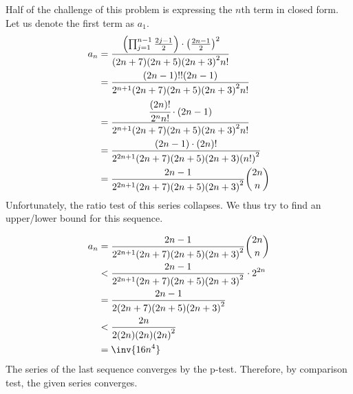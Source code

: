 \item

Half of the challenge of this problem is expressing the $n$th term in closed form.
Let us denote the first term as $a_1$.
\begin{align*}
	a_n
	 & = \cfrac{
		\left( \prod_{j = 1}^{n - 1} \frac{2j - 1}{2} \right) \cdot {\left( \frac{2n - 1}{2} \right)}^2
	}{
		(2n + 7) (2n + 5) {(2n + 3)}^2 n!
	}                                                                                              \\
	 & = \frac{(2n - 1)!! (2n - 1)}{2^{n + 1} (2n + 7) (2n + 5) {(2n + 3)}^2 n!}                   \\
	 & = \cfrac{\cfrac{(2n)!}{2^n n!} \cdot (2n - 1)}{2^{n + 1} (2n + 7) (2n + 5) {(2n + 3)}^2 n!} \\
	 & = \frac{(2n - 1) \cdot (2n)!}{2^{2n + 1} (2n + 7) (2n + 5) (2n + 3) {(n!)}^2} \\
  & = \frac{2n - 1}{2^{2n + 1} (2n + 7) (2n + 5) {(2n + 3)}^2} \binom{2n}{n}
\end{align*}
Unfortunately, the ratio test of this series collapses.
We thus try to find an upper/lower bound for this sequence.

\begin{align*}
    a_n
    &= \frac{2n - 1}{2^{2n + 1} (2n + 7) (2n + 5) {(2n + 3)}^2} \binom{2n}{n} \\
    &< \frac{2n - 1}{2^{2n + 1} (2n + 7) (2n + 5) {(2n + 3)}^2} \cdot 2^{2n} \\
    &=\frac{2n - 1}{2 (2n + 7) (2n + 5) {(2n + 3)}^2} \\
    &< \frac{2n}{2 (2n) (2n) {(2n)}^2} \\
    &= \inv{16 n^4}
\end{align*}
The series of the last sequence converges by the p-test.
Therefore, by comparison test, the given series converges.
